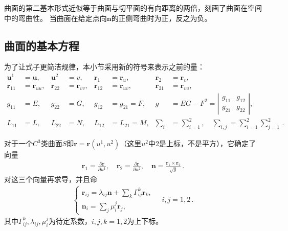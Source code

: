 曲面的第二基本形式近似等于曲面与切平面的有向距离的两倍，刻画了曲面在空间中的弯曲性。
当曲面在给定点向$\bm n$的正侧弯曲时为正，反之为负。

\subsection{曲面的基本方程}\label{sub:曲面的基本方程}
\begin{notation}
    为了让式子更简洁规律，本小节采用新的符号来表示之前的量：
    \begin{align*}%
        \bm u^1    & =\bm u,      & \bm u^2    & =v,          & \bm r_1    & =\bm r_u,    & \bm r_2         & =\bm r_v,                                                                                       \\
        \bm r_{11} & =\bm r_{uu}, & \bm r_{22} & =\bm r_{vv}, & \bm r_{12} & =\bm r_{uv}, & \bm r_{21}      & =\bm r_{vu},                                                                                    \\
        g_{11}     & =E,          & g_{22}     & =G,          & g_{12}     & =g_{21}=F,   & g               & =EG-F^2=\left|\begin{array}{cc}g_{11}&g_{12}\\ g_{21}&g_{22}\end{array}\right|,                                                \\
        L_{11}     & =L,          & L_{22}     & =N,          & L_{12}     & =L_{21}=M,   & \sum\limits_{i} & =\sum\limits_{i=1}^{2},\quad \sum\limits_{i,j}=\sum\limits_{i=1}^{2}{\sum\limits_{j=1}^{2}}\, .
    \end{align*}
\end{notation}

对于一个$C^3$类曲面$S$即$\bm r=\bm r(u^1,u^2)$（这里$u^2$中2是上标，不是平方），它确定了向量
\begin{align}\label{eq:03ex01.26}
    \bm r_1=\frac{\partial \bm r}{\partial u^1}, \quad \bm r_2=\frac{\partial \bm r}{\partial u^2}, \quad \bm n=\frac{\bm r_1\times\bm r_2}{\sqrt{g}}\, .
\end{align}
对这三个向量再求导，并且命
\begin{align}\label{eq:03ex01.27}
    \left\{\begin{array}{l}
        \displaystyle\bm r_{ij}=\lambda_{ij}\bm n+\sum\limits_{k}{\varGamma_{ij}^k\bm r_k}, \\
        \displaystyle\bm n_i=\sum\limits_{j}{\mu_i^j\bm r_j},
    \end{array}\right.\quad i,j=1,2\, .
\end{align}
其中$\varGamma_{ij}^k,\lambda_{ij},\mu_i^j$为待定系数，$i,j,k=1,2$为上下标。

